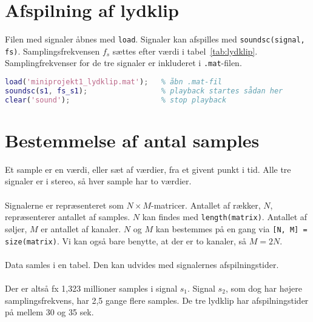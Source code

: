 \documentclass[a4paper]{report}
\begin{document}
\section{Afspilning af lydklip}

        \begin{par}

Filen med signaler åbnes med \texttt{load}.
Signaler kan afspilles med \texttt{soundsc(signal, fs)}.
Samplingsfrekvensen $f_s$ sættes efter værdi i tabel~\ref{tab:lydklip}.
Samplingfrekvenser for de tre signaler er inkluderet i
\texttt{.mat}-filen.

\end{par} 

\begin{lstlisting}[language=Matlab, style=Matlab-editor]
load('miniprojekt1_lydklip.mat');   % åbn .mat-fil
soundsc(s1, fs_s1);                 % playback startes sådan her
clear('sound');                     % stop playback
\end{lstlisting}



\section{Bestemmelse af antal samples}

        \begin{par}

Et sample er en værdi, eller sæt af værdier, fra et givent punkt i tid.
Alle tre signaler er i stereo, så hver sample har to værdier.\\\\
Signalerne er repræsenteret som $N\times M$-matricer.
Antallet af rækker, $N$, repræsenterer antallet af samples.
$N$ kan findes med \texttt{length(matrix)}.
Antallet af søljer, $M$ er antallet af kanaler.
$N$ og $M$ kan bestemmes på en gang via \texttt{[N, M] = size(matrix)}.
Vi kan også bare benytte, at der er to kanaler, så $M = 2N$. \\\\
Data samles i en tabel. Den kan udvides med signalernes afspilningstider.\\\\
Der er altså fx 1,323 millioner samples i signal $s_1$.
Signal $s_2$, som dog har højere samplingsfrekvens, har 2,5 gange flere
samples.
De tre lydklip har afspilningstider på mellem 30 og 35 sek.\\\\

\end{par} 
\end{document}
